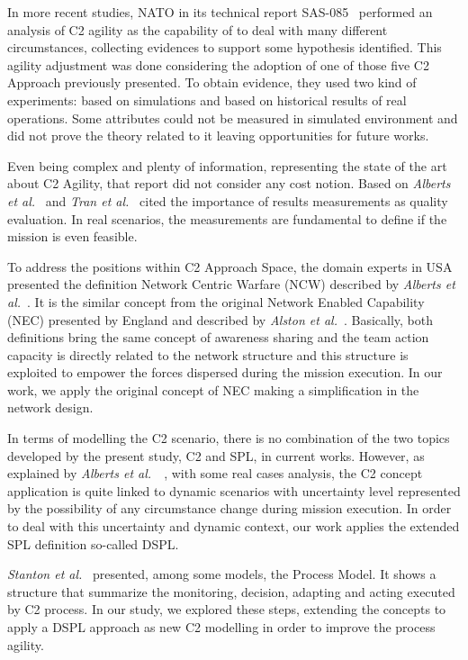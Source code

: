In more recent studies, \gls{NATO} in its technical report SAS-085~\cite{FRANCE2014} performed an analysis of C2 agility as the capability of to deal with many different circumstances, collecting evidences to support some hypothesis identified. This agility adjustment was done considering the adoption of one of those five C2 Approach previously presented. To obtain evidence, they used two kind of experiments: based on simulations and based on historical results of real operations. Some attributes could not be measured in simulated environment and did not prove the theory related to it leaving opportunities for future works. 

Even being complex and plenty of information, representing the state of the art about C2 Agility, that report did not consider any cost notion. Based on \textit{Alberts et al.}~\cite{Alberts2006} and \textit{Tran et al.}~\cite{C2-20} cited the importance of results measurements as quality evaluation. In real scenarios, the measurements are fundamental to define if the mission is even feasible. 

To address the positions within C2 Approach Space, the domain experts in USA presented the definition Network Centric Warfare (NCW) described by \textit{Alberts et al.}~\cite{Alberts2000}. It is the similar concept from the original Network Enabled Capability (NEC) presented by England and described by \textit{Alston et al.}~\cite{AnthonyAlston2003}. Basically, both definitions bring the same concept of awareness sharing and the team action capacity is directly related to the network structure and this structure is exploited to empower the forces dispersed during the mission execution. In our work, we apply the original concept of NEC making a simplification in the network design.

In terms of modelling the C2 scenario, there is no combination of the two topics developed by the present study, C2 and SPL, in current works. However, as explained by \textit{Alberts et al.}~\cite{Power01}~\cite{Alberts2006}, with some real cases analysis, the C2 concept application is quite linked to dynamic scenarios with uncertainty level represented by the possibility of any circumstance change during mission execution. In order to deal with this uncertainty and dynamic context, our work applies the extended SPL definition so-called DSPL.

\textit{Stanton et al.}~\cite{Stanton2007} presented, among some models, the Process Model. It shows a structure that summarize the monitoring, decision, adapting and acting executed by C2 process. In our study, we explored these steps, extending the concepts to apply a DSPL approach as new C2 modelling in order to improve the process agility. 

